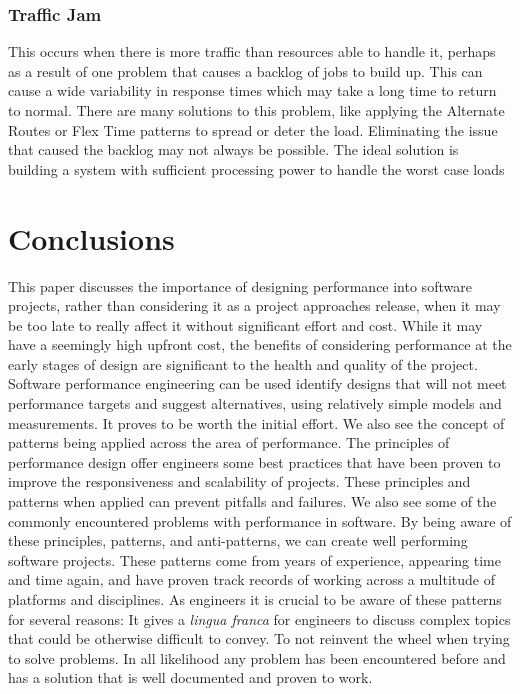 \documentclass[a4paper,11pt,article,oneside]{memoir}
\begin{document}
	\subsection{Traffic Jam}
	This occurs when there is more traffic than resources able to handle it, perhaps as a result of one problem that causes a backlog of jobs to build up. This can cause a wide variability in response times which may take a long time to return to normal. There are many solutions to this problem, like applying the Alternate Routes or Flex Time patterns to spread or deter the load. Eliminating the issue that caused the backlog may not always be possible. The ideal solution is building a system with sufficient processing power to handle the worst case loads
	\chapter{Conclusions}
	This paper discusses the importance of designing performance into software projects, rather than considering it as a project approaches release, when it may be too late to really affect it without significant effort and cost. While it may have a seemingly high upfront cost, the benefits of considering performance at the early stages of design are significant to the health and quality of the project. Software performance engineering can be used identify designs that will not meet performance targets and suggest alternatives, using relatively simple models and measurements. It proves to be worth the initial effort. 
	We also see the concept of patterns being applied across the area of performance. The principles of performance design offer engineers some best practices that have been proven to improve the responsiveness and scalability of projects. These principles and patterns when applied can prevent pitfalls and failures. We also see some of the commonly encountered problems with performance in software. By being aware of these principles, patterns, and anti-patterns, we can create well performing software projects. These patterns come from years of experience, appearing time and time again, and have proven track records of working across a multitude of platforms and disciplines. As engineers it is crucial to be aware of these patterns for several reasons:
	It gives a \textit{lingua franca} for engineers to discuss complex topics that could be otherwise difficult to convey. 
	To not reinvent the wheel when trying to solve problems. In all likelihood any problem has been encountered before and has a solution that is well documented and proven to work.
	
	\newpage
	\nocite{*}
	\printbibliography
	
\end{document}
